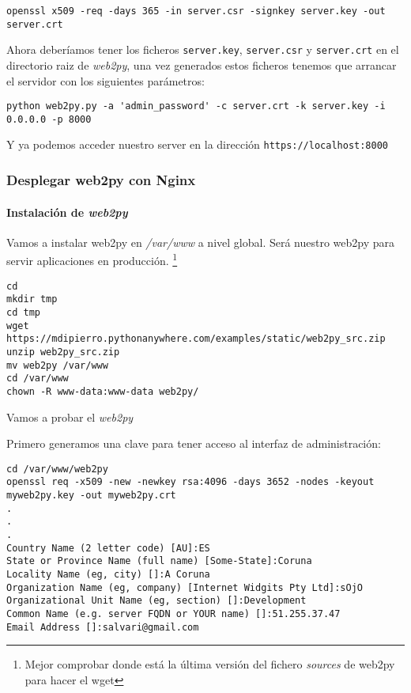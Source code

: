 \documentclass[12pt,spanish,]{article}
\let\oldparagraph\paragraph
\renewcommand{\paragraph}[1]{\oldparagraph{#1}\mbox{}}
\begin{document}
\begin{verbatim}
openssl x509 -req -days 365 -in server.csr -signkey server.key -out server.crt
\end{verbatim}

Ahora deberíamos tener los ficheros \texttt{server.key},
\texttt{server.csr} y \texttt{server.crt} en el directorio raiz de
\emph{web2py}, una vez generados estos ficheros tenemos que arrancar el
servidor con los siguientes parámetros:

\begin{verbatim}
python web2py.py -a 'admin_password' -c server.crt -k server.key -i 0.0.0.0 -p 8000
\end{verbatim}

Y ya podemos acceder nuestro server en la dirección
\texttt{https://localhost:8000}

\hypertarget{desplegar-web2py-con-nginx}{%
\subsubsection{Desplegar web2py con
Nginx}\label{desplegar-web2py-con-nginx}}

\hypertarget{instalaciuxf3n-de-web2py-1}{%
\paragraph{\texorpdfstring{Instalación de
\emph{web2py}}{Instalación de web2py}}\label{instalaciuxf3n-de-web2py-1}}

Vamos a instalar web2py en \emph{/var/www} a nivel global. Será nuestro
web2py para servir aplicaciones en producción. \footnote{Mejor comprobar
  donde está la última versión del fichero \emph{sources} de web2py para
  hacer el wget}

\begin{verbatim}
cd
mkdir tmp
cd tmp
wget https://mdipierro.pythonanywhere.com/examples/static/web2py_src.zip
unzip web2py_src.zip
mv web2py /var/www
cd /var/www
chown -R www-data:www-data web2py/
\end{verbatim}

Vamos a probar el \emph{web2py}

Primero generamos una clave para tener acceso al interfaz de
administración:

\begin{verbatim}
cd /var/www/web2py
openssl req -x509 -new -newkey rsa:4096 -days 3652 -nodes -keyout myweb2py.key -out myweb2py.crt
.
.
.
Country Name (2 letter code) [AU]:ES
State or Province Name (full name) [Some-State]:Coruna
Locality Name (eg, city) []:A Coruna
Organization Name (eg, company) [Internet Widgits Pty Ltd]:sOjO
Organizational Unit Name (eg, section) []:Development
Common Name (e.g. server FQDN or YOUR name) []:51.255.37.47
Email Address []:salvari@gmail.com
\end{verbatim}
\end{document}
